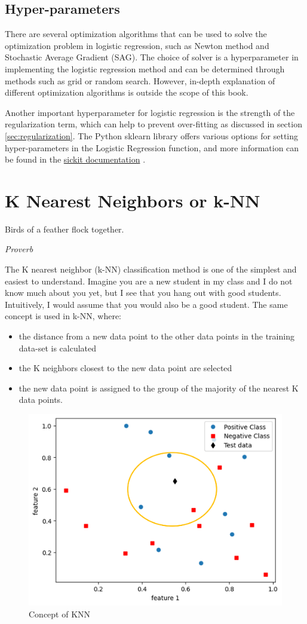 \subsection{Hyper-parameters}
There are several optimization algorithms that can be used to solve the optimization problem in logistic regression, such as Newton method and Stochastic Average Gradient (SAG). The choice of solver is a hyperparameter in implementing the logistic regression method and can be determined through methods such as grid or random search. However, in-depth explanation of different optimization algorithms is outside the scope of this book.

Another important hyperparameter for logistic regression is the strength of the regularization term, which can help to prevent over-fitting as discussed in section \ref{sec:regularization}. The Python sklearn library offers various options for setting hyper-parameters in the Logistic Regression function, and more information can be found in the \href{https://scikit-learn.org/stable/modules/linear_model.html#logistic-regression}{sickit documentation} \cite{web:sklearn}.




\newpage

\section{K Nearest Neighbors or k-NN}

\epigraph{Birds of a feather flock together. }{\textit{Proverb}}

The K nearest neighbor (k-NN) classification method is one of the simplest and easiest to understand. Imagine you are a new student in my class and I do not know much about you yet, but I see that you hang out with good students. Intuitively, I would assume that you would also be a good student. The same concept is used in k-NN, where:
\begin{itemize}
  \item the distance from a new data point to the other data points in the training data-set is calculated
  \item the K neighbors closest to the new data point are selected
  \item the new data point is assigned to the group of the majority of the nearest K data points.
\end{itemize}

\begin{figure}[!h]
  \centering
  \includegraphics[width=7.5 cm]{knn_2.png}
  \caption{Concept of KNN}
  \label{fig:knn}
\end{figure}

